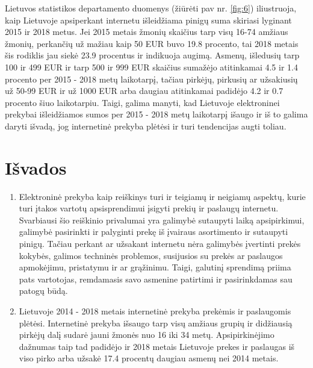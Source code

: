 \documentclass[12pt, titlepage]{article}
\begin{document}
\medskip
\par
Lietuvos statistikos departamento duomenys (žiūrėti pav nr. \ref{fig:6}) iliustruoja, kaip Lietuvoje apsiperkant internetu išleidžiama pinigų suma skiriasi lyginant 2015 ir 2018 metus. Jei 2015 metais žmonių skaičius tarp visų 16-74 amžiaus žmonių, perkančių už mažiau kaip 50 EUR buvo 19.8 procento, tai 2018 metais šis rodiklis jau siekė 23.9 procentus ir indikuoja augimą. Asmenų, išledusių tarp 100 ir 499 EUR ir tarp 500 ir 999 EUR skaičius sumažėjo atitinkamai 4.5 ir 1.4 procento per 2015 - 2018 metų laikotarpį, tačiau pirkėjų, pirkusių ar užsakiusių už 50-99 EUR ir už 1000 EUR arba daugiau atitinkamai padidėjo 4.2 ir 0.7 procento šiuo laikotarpiu. Taigi, galima manyti, kad Lietuvoje elektroninei prekybai išleidžiamos sumos per 2015 - 2018 metų laikotarpį išaugo ir iš to galima daryti išvadą, jog internetinė prekyba plėtėsi ir turi tendencijas augti toliau.
\newpage
\section{Išvados}
\medskip
\par
\hspace{\parindent}
\begin{enumerate}
\item Elektroninė prekyba kaip reiškinys turi ir teigiamų ir neigiamų aspektų, kurie turi įtakos vartotų apsisprendimui įsigyti prekių ir paslaugų internetu. Svarbiausi šio reiškinio privalumai yra galimybė sutaupyti laiką apsipirkimui, galimybė pasirinkti ir palyginti prekę iš įvairaus asortimento ir sutaupyti pinigų. Tačiau perkant ar užsakant internetu nėra galimybės įvertinti prekės kokybės, galimos techninės problemos, susijusios su prekės ar paslaugos apmokėjimu, pristatymu ir ar grąžinimu. Taigi, galutinį sprendimą priima pats vartotojas, remdamasis savo asmenine patirtimi ir pasirinkdamas sau patogų būdą.
\item Lietuvoje 2014 - 2018 metais internetinė prekyba prekėmis ir paslaugomis plėtėsi. Internetinė prekyba išsaugo tarp visų amžiaus grupių ir didžiausią pirkėjų dalį sudarė jauni žmonės nuo 16 iki 34 metų. Apsipirkinėjimo dažnumas taip tad padidėjo ir 2018 metais Lietuvoje prekes ir paslaugas iš viso pirko arba užsakė 17.4 procentų daugiau asmenų nei 2014 metais.
\end{enumerate}
\newpage
\printbibliography[title={Literatūros sąrašas}]
\end{document}
